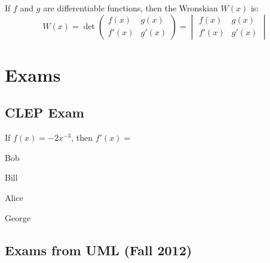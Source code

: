 \documentclass[crop=false,class=book,oneside]{standalone}                      %
\begin{document}
        \begin{definition}
            If $f$ and $g$ are differentiable functions,
            then the Wronskian $W(x)$ is:
            \begin{equation*}
                W(x)=
                \det
                \begin{pmatrix}
                    f(x)&g(x)\\
                    f'(x)&g'(x)
                \end{pmatrix}
                =
                \begin{vmatrix}
                    f(x)&g(x)\\
                    f'(x)&g'(x)
                \end{vmatrix}
            \end{equation*}
        \end{definition}
    \section{Exams}
    \subsection{CLEP Exam}
        \begin{problem}
            If $f(x)=-2x^{-3}$, then $f'(x)=$
            \begin{enumerate}[label=(\Alph*)]
                \begin{multicols}{4}
                    \item Bob
                    \item Bill
                    \item Alice
                    \item George
                \end{multicols}
            \end{enumerate}
        \end{problem}
    \subsection{Exams from UML (Fall 2012)}
\end{document}
